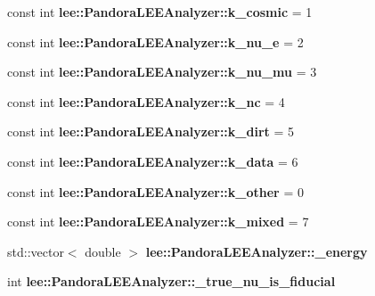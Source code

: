 \begin{DoxyCompactItemize}
\item 
\hypertarget{group__lee_ga048d617faeb0aadea21f43c805dadb1f}{const int {\bfseries lee\-::\-Pandora\-L\-E\-E\-Analyzer\-::k\-\_\-cosmic} = 1}\label{group__lee_ga048d617faeb0aadea21f43c805dadb1f}

\item 
\hypertarget{group__lee_ga9d7e6f745c8e67c74f49b904cbfa5d61}{const int {\bfseries lee\-::\-Pandora\-L\-E\-E\-Analyzer\-::k\-\_\-nu\-\_\-e} = 2}\label{group__lee_ga9d7e6f745c8e67c74f49b904cbfa5d61}

\item 
\hypertarget{group__lee_gaeeae8fe7055f10e2f6a30892926fd510}{const int {\bfseries lee\-::\-Pandora\-L\-E\-E\-Analyzer\-::k\-\_\-nu\-\_\-mu} = 3}\label{group__lee_gaeeae8fe7055f10e2f6a30892926fd510}

\item 
\hypertarget{group__lee_ga27261a8cfcfebab466011b2952a8969b}{const int {\bfseries lee\-::\-Pandora\-L\-E\-E\-Analyzer\-::k\-\_\-nc} = 4}\label{group__lee_ga27261a8cfcfebab466011b2952a8969b}

\item 
\hypertarget{group__lee_gafa596ee5d7a68568ce5371f17c38ee96}{const int {\bfseries lee\-::\-Pandora\-L\-E\-E\-Analyzer\-::k\-\_\-dirt} = 5}\label{group__lee_gafa596ee5d7a68568ce5371f17c38ee96}

\item 
\hypertarget{group__lee_ga00720d429d223c6bfd351b500b287517}{const int {\bfseries lee\-::\-Pandora\-L\-E\-E\-Analyzer\-::k\-\_\-data} = 6}\label{group__lee_ga00720d429d223c6bfd351b500b287517}

\item 
\hypertarget{group__lee_ga397f9459c5ff25721ca99fa9b9df4880}{const int {\bfseries lee\-::\-Pandora\-L\-E\-E\-Analyzer\-::k\-\_\-other} = 0}\label{group__lee_ga397f9459c5ff25721ca99fa9b9df4880}

\item 
\hypertarget{group__lee_ga75e327e4124da9ee9a1a95a4126be377}{const int {\bfseries lee\-::\-Pandora\-L\-E\-E\-Analyzer\-::k\-\_\-mixed} = 7}\label{group__lee_ga75e327e4124da9ee9a1a95a4126be377}

\item 
\hypertarget{group__lee_gaf64e85c1a6351ba43d787ae01d82f34e}{std\-::vector$<$ double $>$ {\bfseries lee\-::\-Pandora\-L\-E\-E\-Analyzer\-::\-\_\-energy}}\label{group__lee_gaf64e85c1a6351ba43d787ae01d82f34e}

\item 
\hypertarget{group__lee_ga0fb26f882cca04dd6e9d6162808365c8}{int {\bfseries lee\-::\-Pandora\-L\-E\-E\-Analyzer\-::\-\_\-true\-\_\-nu\-\_\-is\-\_\-fiducial}}\label{group__lee_ga0fb26f882cca04dd6e9d6162808365c8}


\end{DoxyCompactItemize}
